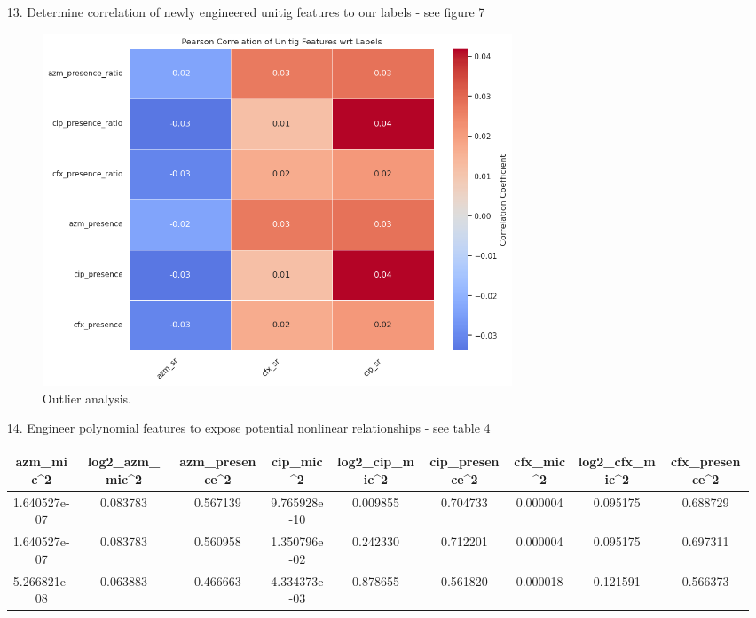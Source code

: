 \documentclass[manuscript,screen,review, nonacm]{acmart}
\begin{document}
\begin{itemize}
    \item[13.] Determine correlation of newly engineered unitig features to our labels - see figure 7
        \begin{figure}[H]
            \centering
            \vspace{-10pt}
            \includegraphics[width=0.7\textwidth]{figures/unitig_corr.png}
            \caption{Outlier analysis.}
            \vspace{-10pt}
        \end{figure}
    \item[14.] Engineer polynomial features to expose potential nonlinear relationships - see table 4
        \begin{table}[H]
            \centering
            \begin{tabular}{|c|c|c|c|c|c|c|c|c|}
            \hline
            \textbf{azm\_mic\^{}2} & \textbf{log2\_azm\_mic\^{}2} & \textbf{azm\_presence\^{}2} & \textbf{cip\_mic\^{}2} & \textbf{log2\_cip\_mic\^{}2} & \textbf{cip\_presence\^{}2} & \textbf{cfx\_mic\^{}2} & \textbf{log2\_cfx\_mic\^{}2} & \textbf{cfx\_presence\^{}2} \\ \hline
            1.640527e-07           & 0.083783                      & 0.567139                     & 9.765928e-10            & 0.009855                      & 0.704733                     & 0.000004                 & 0.095175                      & 0.688729                    \\ \hline
            1.640527e-07           & 0.083783                      & 0.560958                     & 1.350796e-02            & 0.242330                      & 0.712201                     & 0.000004                 & 0.095175                      & 0.697311                    \\ \hline
            5.266821e-08           & 0.063883                      & 0.466663                     & 4.334373e-03            & 0.878655                      & 0.561820                     & 0.000018                 & 0.121591                      & 0.566373                    \\ \hline

\end{tabular}
\end{table}
\end{itemize}
\end{document}
